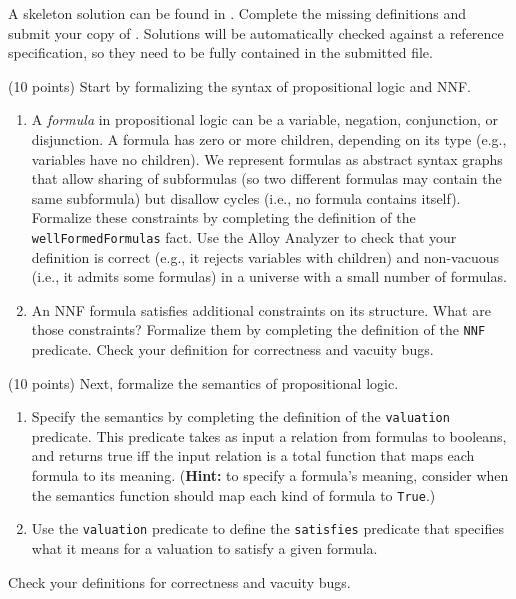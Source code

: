 \documentclass{handout}
\begin{document}
A skeleton solution can be found in .  Complete the missing
definitions and submit your copy of .  Solutions will be
automatically checked against a reference specification, so they need to be
fully contained in the submitted file.


\begin{questions}
\item \label{prob:alloy:first} (10 points) Start by formalizing the syntax of propositional logic and NNF.
\begin{enumerate}
\item A \emph{formula} in propositional logic can be a variable, negation,
conjunction, or disjunction. A formula has zero or more children, depending on
its type (e.g., variables have no children).  We represent formulas as abstract
syntax graphs that allow sharing of subformulas (so two different formulas may
contain the same subformula) but disallow cycles (i.e., no formula contains
itself). Formalize these constraints by completing the definition of the
\texttt{wellFormedFormulas} fact. Use the Alloy Analyzer to check that your
definition is correct (e.g., it rejects variables with children) and non-vacuous
(i.e., it admits some formulas) in a universe with a small number of formulas.

\item An NNF formula satisfies additional constraints on its structure.  What
are those constraints?     Formalize them by completing the definition of the
\texttt{NNF} predicate.  Check your definition for correctness and vacuity bugs.


\end{enumerate}

\item (10 points) Next, formalize the semantics of propositional logic.
\begin{enumerate}
\item Specify the semantics by completing the definition of the
\texttt{valuation} predicate. This predicate takes as input a relation from
formulas to booleans, and returns true iff the input relation is a total
function that maps each formula to its meaning. (\textbf{Hint:} to specify a
formula's meaning, consider when the semantics function should map each kind of
formula to \texttt{True}.)

\item Use the \texttt{valuation} predicate to define the \texttt{satisfies}
predicate that specifies what it means for a valuation to satisfy a given
formula.
\end{enumerate}
Check your definitions for correctness and vacuity bugs.



\end{questions}
\end{document}
